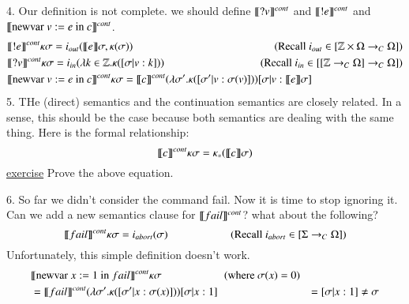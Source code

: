 \documentclass{report}[12pt]
\begin{document}
4. Our definition is not complete. we should define $\llbracket ?v \rrbracket^{cont}$ and $\llbracket !e \rrbracket^{cont}$ and $\llbracket \text{newvar }v:=e \text{ in }c \rrbracket^{cont}$.
\begin{alignat*}{2}
  &\interp{!e}^{cont} \kappa \sigma = i_{out}(\interp{e}\sigma, \kappa(\sigma)) &\hspace{-2cm}(\text{Recall }i_{out} \in [\mathbb{Z}\times \Omega \rightarrow_C \Omega]) \\
  &\interp{?v}^{cont} \kappa \sigma = i_{in} (\lambda k\in \mathbb{Z}. \kappa ([\sigma|v:k])) &\hspace{-2cm}(\text{Recall }i_{in} \in [[\mathbb{Z} \rightarrow_C \Omega] \rightarrow_C \Omega]) \\
  &\interp{\text{newvar }v:=e\text{ in }c}^{cont} \kappa \sigma = \interp{c}^{cont} (\lambda \sigma'. \kappa ([\sigma' | v:\sigma(v)]))[\sigma|v:\interp{e}\sigma]
\end{alignat*}
5. THe (direct) semantics and the continuation semantics are closely related. In a sense, this should be the case because both semantics are dealing with the same thing. Here is the formal relationship:
\[\llbracket c \rrbracket^{cont} \kappa \sigma = \kappa_* (\llbracket c \rrbracket\sigma)\]
\underline{exercise} Prove the above equation.

6. So far we didn't consider the command fail. Now it is time to stop ignoring it. Can we add a new semantics clause for $\llbracket fail \rrbracket^{cont}$? what about the following?
\[\llbracket fail \rrbracket^{cont} \kappa \sigma = i_{abort} (\sigma)\hspace{2cm} (\text{Recall }i_{abort}\in [\Sigma \rightarrow_C \Omega])\]
Unfortunately, this simple definition doesn't work.
\begin{align*}
  &\llbracket \text{newvar }x:=1\text{ in }fail \rrbracket^{cont} \kappa \sigma \hspace{2cm}(\text{where }\sigma(x) = 0) \\
  &=\llbracket fail \rrbracket^{cont} (\lambda \sigma'. \kappa ([\sigma'|x:\sigma(x)])) [\sigma|x:1]
  &=[\sigma|x:1] \neq \sigma
\end{align*}
\end{document}
